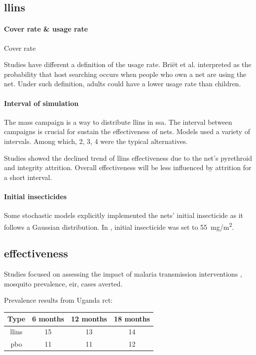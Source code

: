 \documentclass[a4paper, 12pt, twoside]{article}
\begin{document}
\subsection{\texorpdfstring{\gls{llins}}{LLINs}}%
\label{sub:llins}

\paragraph{Cover rate \& usage rate}%
\label{par:cover_rate_usage_rate}
Cover rate

Studies have different a definition of the usage rate.
Briët et al.\cite{Briet2013} interpreted as the probability that host searching occurs when people who own a net are using the net.
Under such definition, adults could have a lower usage rate than children.

\paragraph{Interval of simulation}%
\label{par:interval_of_simulation}
The mass campaign is a way to distribute \gls{llins} in \gls{ssa}.
The interval between campaigns is crucial for sustain the effectiveness of nets.
Models used a variety of intervals.
Among which, 2, 3, 4\cite{Walker2016} were the typical alternatives.

Studies showed the declined trend of \gls{llins} effectiveness due to the net's pyrethroid and integrity attrition.
Overall effectiveness will be less influenced by attrition for a short interval.

\paragraph{Initial insecticides}%
\label{par:initial_insecticides}
Some stochastic models explicitly implemented the nets' initial insecticide as it follows a Gaussian distribution.
In \cite{Briet2013}, initial insecticide was set to \SI{55}{mg/m^2}.

\subsection{effectiveness}
Studies focused on assessing the impact of malaria transmission interventions , mosquito prevalence, \gls{eir}, cases averted.

Prevalence results from Uganda \gls{rct}\cite{Staedke2020}:
\begin{center}
	\begin{tabular}{c c c c}
		Type        & 6 months & 12 months & 18 months \\
		\hline
		\gls{llins} & 15       & 13        & 14        \\
		\gls{pbo}   & 11       & 11        & 12        \\
	\end{tabular}
\end{center}
\end{document}
